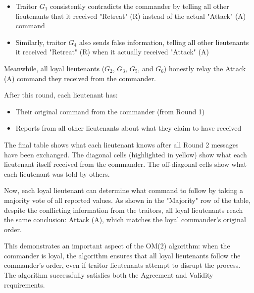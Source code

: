 \documentclass[11pt]{article}
\newcommand{\gen}[1]{\ensuremath{G_{#1}}}
\begin{document}
\begin{itemize}
    \item Traitor $\gen{1}$ consistently contradicts the commander by telling all other lieutenants that it received "Retreat" (R) instead of the actual "Attack" (A) command

    \item Similarly, traitor $\gen{4}$ also sends false information, telling all other lieutenants it received "Retreat" (R) when it actually received "Attack" (A)
\end{itemize}

Meanwhile, all loyal lieutenants ($\gen{2}$, $\gen{3}$, $\gen{5}$, and $\gen{6}$) honestly relay the Attack (A) command they received from the commander.

After this round, each lieutenant has:
\begin{itemize}
    \item Their original command from the commander (from Round 1)
    \item Reports from all other lieutenants about what they claim to have received
\end{itemize}

The final table shows what each lieutenant knows after all Round 2 messages have been exchanged. The diagonal cells (highlighted in yellow) show what each lieutenant itself received from the commander. The off-diagonal cells show what each lieutenant was told by others.

Now, each loyal lieutenant can determine what command to follow by taking a majority vote of all reported values. As shown in the "Majority" row of the table, despite the conflicting information from the traitors, all loyal lieutenants reach the same conclusion: Attack (A), which matches the loyal commander's original order.

This demonstrates an important aspect of the OM(2) algorithm: when the commander is loyal, the algorithm ensures that all loyal lieutenants follow the commander's order, even if traitor lieutenants attempt to disrupt the process. The algorithm successfully satisfies both the Agreement and Validity requirements.

%
%
\end{document}
